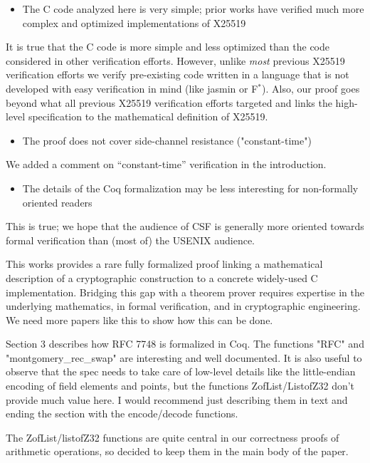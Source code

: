 \begin{center}
\end{center}

\begin{itemize}
  \item The C code analyzed here is very simple; prior works have verified much more complex and optimized implementations of X25519
\end{itemize}
\begin{answer}
  It is true that the C code is more simple and less optimized than the code considered in other verification efforts.
  However, unlike \emph{most} previous X25519 verification efforts we verify pre-existing code written in a language
  that is not developed with easy verification in mind (like jasmin or F$^*$).
  Also, our proof goes beyond what all previous X25519 verification efforts targeted and links the
  high-level specification to the mathematical definition of X25519.
\end{answer}
\begin{itemize}
  \item The proof does not cover side-channel resistance ("constant-time")
\end{itemize}
\begin{answer}
  We added a comment on ``constant-time'' verification in the introduction.
\end{answer}
\begin{itemize}
  \item The details of the Coq formalization may be less interesting for non-formally oriented readers
\end{itemize}
\begin{answer}
  This is true; we hope that the audience of CSF is generally more oriented towards formal verification
  than (most of) the USENIX audience.
\end{answer}

\begin{center}
\end{center}
This works provides a rare fully formalized proof linking a mathematical description of a cryptographic construction to a concrete widely-used C implementation. Bridging this gap with a theorem prover requires expertise in the underlying mathematics, in formal verification, and in cryptographic engineering. We need more papers like this to show how this can be done.

Section 3 describes how RFC 7748 is formalized in Coq. The functions "RFC" and "montgomery\_rec\_swap" are interesting and well documented. It is also useful to observe that the spec needs to take care of low-level details like the little-endian encoding of field elements and points, but the functions ZofList/ListofZ32 don't provide much value here. I would recommend just describing them in text and ending the section with the encode/decode functions.
\begin{answer}
  The ZofList/listofZ32 functions are quite central in our correctness proofs
  of arithmetic operations, so decided to keep them in the main body of the paper.
\end{answer}

